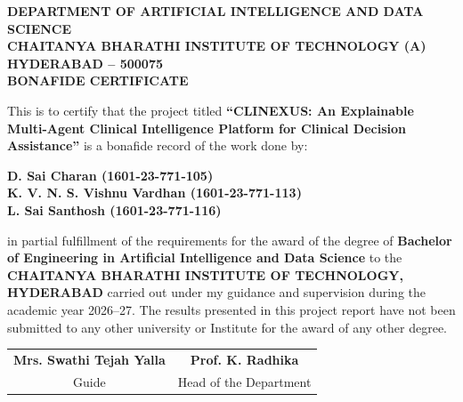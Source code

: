 \documentclass[12pt,a4paper]{report}
\begin{document}
\newpage
\begin{center}
    \vspace{0.4cm}
    
    \textbf{\large DEPARTMENT OF ARTIFICIAL INTELLIGENCE AND DATA SCIENCE}\\[0.1cm]
    \textbf{\large CHAITANYA BHARATHI INSTITUTE OF TECHNOLOGY (A)}\\[0.1cm]
    \textbf{\large HYDERABAD -- 500075}\\[1.0cm]
    
    \textbf{\Large BONAFIDE CERTIFICATE}\\[1.0cm]
\end{center}

This is to certify that the project titled \textbf{``CLINEXUS: An Explainable Multi-Agent Clinical Intelligence Platform for Clinical Decision Assistance''} is a bonafide record of the work done by:

\begin{center}
    \textbf{D. Sai Charan (1601-23-771-105)}\\[0.15cm]
    \textbf{K. V. N. S. Vishnu Vardhan (1601-23-771-113)}\\[0.15cm]
    \textbf{L. Sai Santhosh (1601-23-771-116)}\\
\end{center}

\noindent in partial fulfillment of the requirements for the award of the degree of \textbf{Bachelor of Engineering in Artificial Intelligence and Data Science} to the \textbf{CHAITANYA BHARATHI INSTITUTE OF TECHNOLOGY, HYDERABAD} carried out under my guidance and supervision during the academic year 2026--27. The results presented in this project report have not been submitted to any other university or Institute for the award of any other degree.

\vspace{2.5cm}

\noindent
\begin{tabular*}{\textwidth}{@{\extracolsep{\fill}}cc}
    \textbf{Mrs. Swathi Tejah Yalla} & \textbf{Prof. K. Radhika} \\
    Guide & Head of the Department
\end{tabular*}
\end{document}
